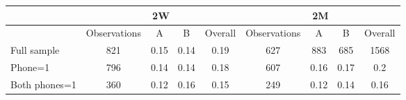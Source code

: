 \begin{tabular}{lcccccccc}
\toprule
      & \multicolumn{4}{c}{2W}        & \multicolumn{4}{c}{2M} \\
\midrule
      & Observations & A     & B     & Overall & Observations & A     & B     & Overall \\
\midrule
\midrule
Full sample & 821   & 0.15  & 0.14  & 0.19  & 627   & 883   & 685   & 1568 \\
Phone=1 & 796   & 0.14  & 0.14  & 0.18  & 607   & 0.16  & 0.17  & 0.2 \\
Both phones=1 & 360   & 0.12  & 0.16  & 0.15  & 249   & 0.12  & 0.14  & 0.16 \\
\bottomrule
\end{tabular}%
